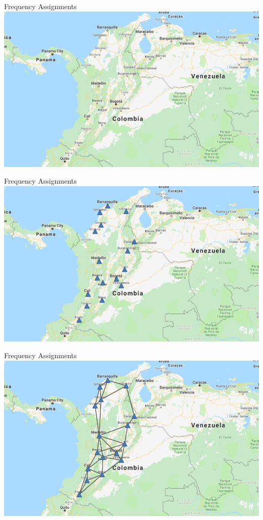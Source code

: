 \documentclass{beamer}
\theoremstyle{definition}
\begin{document}
\begin{frame}{Frequency Assignments}
    \centering \includegraphics[width=.9\linewidth]{col1.png}
\end{frame}
\begin{frame}{Frequency Assignments}
    \centering \includegraphics[width=.9\linewidth]{col2.png}
\end{frame}
\begin{frame}{Frequency Assignments}
    \centering \includegraphics[width=.9\linewidth]{col3.png}
\end{frame}
\end{document}
